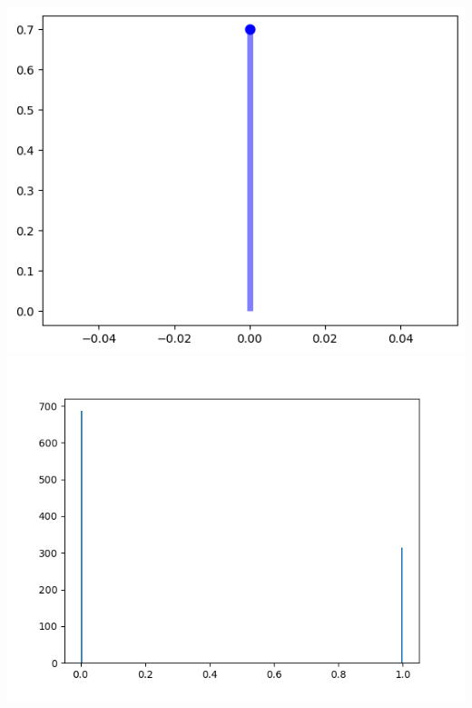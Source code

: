 \documentclass[
  letterpaper,
  DIV=11,
  numbers=noendperiod]{scrreprt}
\theoremstyle{definition}
\theoremstyle{plain}
\theoremstyle{remark}
\begin{document}
\includegraphics{figura1.png} \includegraphics{F2.png}
\end{document}
